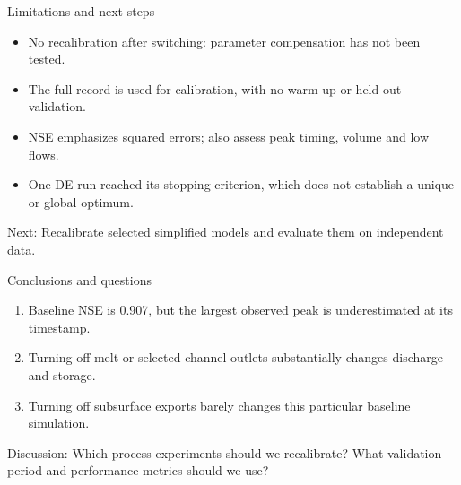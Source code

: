 \documentclass[10pt,aspectratio=169]{beamer}
\begin{document}
\begin{frame}{Limitations and next steps}
\begin{itemize}\item No recalibration after switching: parameter compensation has not been tested.\item The full record is used for calibration, with no warm-up or held-out validation.\item NSE emphasizes squared errors; also assess peak timing, volume and low flows.\item One DE run reached its stopping criterion, which does not establish a unique or global optimum.\end{itemize}
\medskip\textcolor{HDSblue}{Next:} Recalibrate selected simplified models and evaluate them on independent data.\end{frame}
\begin{frame}{Conclusions and questions}
\begin{enumerate}\item Baseline NSE is 0.907, but the largest observed peak is underestimated at its timestamp.\item Turning off melt or selected channel outlets substantially changes discharge and storage.\item Turning off subsurface exports barely changes this particular baseline simulation.\end{enumerate}
\medskip\textcolor{HDSblue}{Discussion:} Which process experiments should we recalibrate? What validation period and performance metrics should we use?\end{frame}
\end{document}

